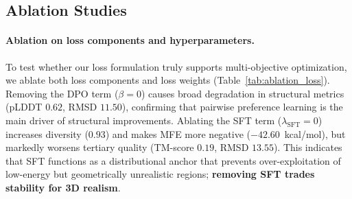 \begin{table}[!t]
\centering
\caption{Pass@k results for generating a sequence with RMSD $< 12$ \AA, pLDDT $> 0.50$, TM-score $> 0.05$, and MFE $< -4.0$ kcal/mol (T = 0.5). RiboPO demonstrates superior sampling efficiency with Multi-round RiboPO achieving the best performance.}
\label{tab:pass_at_k}
\end{table}



\subsection{Ablation Studies}
\label{subsec:ablation_studies}

\paragraph{Ablation on loss components and hyperparameters.}
To test whether our loss formulation truly supports multi-objective optimization, we ablate both loss components and loss weights (Table~\ref{tab:ablation_loss}). Removing the DPO term ($\beta{=}0$) causes broad degradation in structural metrics (pLDDT $0.62$, RMSD $11.50$), confirming that pairwise preference learning is the main driver of structural improvements. Ablating the SFT term ($\lambda_{\text{SFT}}{=}0$) increases diversity ($0.93$) and makes MFE more negative ($-42.60$~kcal/mol), but markedly worsens tertiary quality (TM-score $0.19$, RMSD $13.55$). This indicates that SFT functions as a distributional anchor that prevents over-exploitation of low-energy but geometrically unrealistic regions; \textbf{removing SFT trades stability for 3D realism}. 

